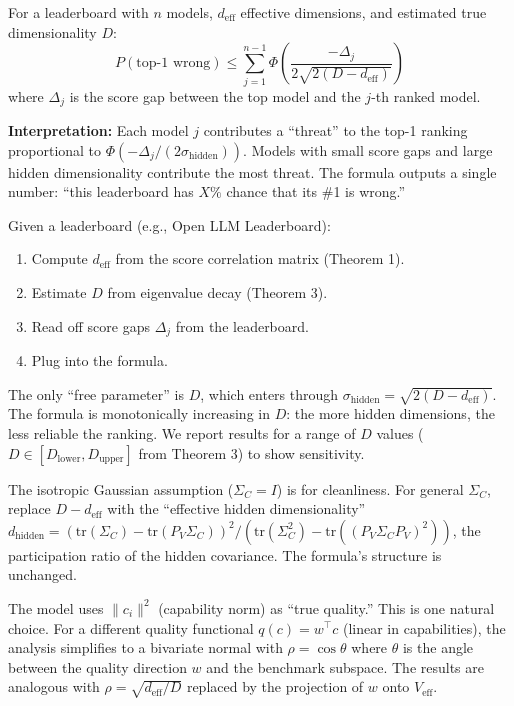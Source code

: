 
\begin{corollary}
\label{cor:formula}
For a leaderboard with $n$ models, $d_{\mathrm{eff}}$ effective dimensions, and estimated true dimensionality $D$:
\[
  \boxed{P(\text{top-1 wrong}) \leq \sum_{j=1}^{n-1} \Phi\!\left(\frac{-\Delta_j}{2\sqrt{2(D - d_{\mathrm{eff}})}}\right)}
\]
where $\Delta_j$ is the score gap between the top model and the $j$-th ranked model.

\textbf{Interpretation:} Each model $j$ contributes a ``threat'' to the top-1 ranking proportional to $\Phi(-\Delta_j / (2\sigma_{\mathrm{hidden}}))$. Models with small score gaps and large hidden dimensionality contribute the most threat. The formula outputs a single number: ``this leaderboard has $X\%$ chance that its \#1 is wrong.''
\end{corollary}

\begin{remark}
Given a leaderboard (e.g., Open LLM Leaderboard):
\begin{enumerate}
  \item Compute $d_{\mathrm{eff}}$ from the score correlation matrix (Theorem 1).
  \item Estimate $D$ from eigenvalue decay (Theorem 3).
  \item Read off score gaps $\Delta_j$ from the leaderboard.
  \item Plug into the formula.
\end{enumerate}
The only ``free parameter'' is $D$, which enters through $\sigma_{\mathrm{hidden}} = \sqrt{2(D - d_{\mathrm{eff}})}$. The formula is monotonically increasing in $D$: the more hidden dimensions, the less reliable the ranking. We report results for a range of $D$ values ($D \in [D_{\mathrm{lower}}, D_{\mathrm{upper}}]$ from Theorem 3) to show sensitivity.
\end{remark}

\begin{remark}
The isotropic Gaussian assumption ($\Sigma_C = I$) is for cleanliness. For general $\Sigma_C$, replace $D - d_{\mathrm{eff}}$ with the ``effective hidden dimensionality'' $d_{\mathrm{hidden}} = (\mathrm{tr}(\Sigma_C) - \mathrm{tr}(P_V \Sigma_C))^2 / (\mathrm{tr}(\Sigma_C^2) - \mathrm{tr}((P_V \Sigma_C P_V)^2))$, the participation ratio of the hidden covariance. The formula's structure is unchanged.
\end{remark}

\begin{remark}
The model uses $\|c_i\|^2$ (capability norm) as ``true quality.'' This is one natural choice. For a different quality functional $q(c) = w^\top c$ (linear in capabilities), the analysis simplifies to a bivariate normal with $\rho = \cos\theta$ where $\theta$ is the angle between the quality direction $w$ and the benchmark subspace. The results are analogous with $\rho = \sqrt{d_{\mathrm{eff}}/D}$ replaced by the projection of $w$ onto $V_{\mathrm{eff}}$.
\end{remark}

